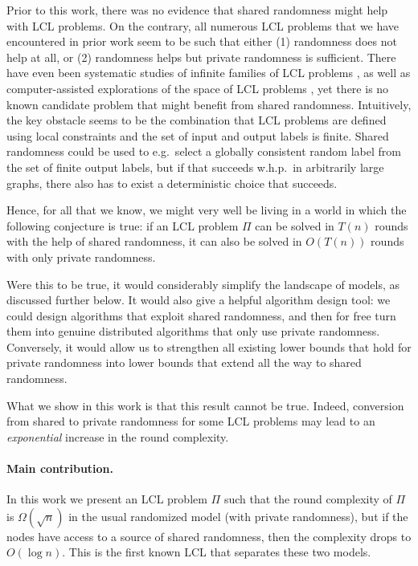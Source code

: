 \documentclass[11pt]{article}
\begin{document}
Prior to this work, there was no evidence that shared randomness might help with LCL problems. On the contrary, all numerous LCL problems that we have encountered in prior work seem to be such that either (1) randomness does not help at all, or (2) randomness helps but private randomness is sufficient. There have even been systematic studies of infinite families of LCL problems \cite{balliu20binary-labeling,chang23automata-theoretic}, as well as computer-assisted explorations of the space of LCL problems \cite{tereshchenko21thesis}, yet there is no known candidate problem that might benefit from shared randomness. Intuitively, the key obstacle seems to be the combination that LCL problems are defined using local constraints and the set of input and output labels is finite. Shared randomness could be used to e.g.\ select a globally consistent random label from the set of finite output labels, but if that succeeds w.h.p.\ in arbitrarily large graphs, there also has to exist a deterministic choice that succeeds.

Hence, for all that we know, we might very well be living in a world in which the following conjecture is true: if an LCL problem $\Pi$ can be solved in $T(n)$ rounds with the help of shared randomness, it can also be solved in $O(T(n))$ rounds with only private randomness.

Were this to be true, it would considerably simplify the landscape of models, as
discussed further below. It would also give a helpful algorithm design
tool: we could design algorithms that exploit shared randomness, and then for
free turn them into genuine distributed algorithms that only use private
randomness. Conversely, it would allow us to strengthen all existing lower
bounds that hold for private randomness into lower bounds that extend all the
way to shared randomness.

What we show in this work is that this result cannot be true. Indeed, conversion from shared to private randomness for some LCL problems may lead to an \emph{exponential} increase in the round complexity.

\paragraph{Main contribution.}

In this work we present an LCL problem $\Pi$ such that the round complexity of $\Pi$ is $\Omega(\sqrt{n})$ in the usual randomized \local model (with private randomness), but if the nodes have access to a source of shared randomness, then the complexity drops to $O(\log n)$. This is the first known LCL that separates these two models.
\end{document}
